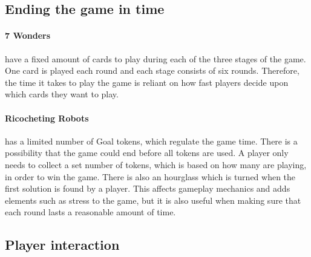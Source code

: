 \documentclass[a4paper]{article}
\begin{document}
\subsection{Ending the game in time}
\paragraph{7 Wonders} have a fixed amount of cards to play during each of the three stages of the game. One card is played each round and each stage consists of six rounds. Therefore, the time it takes to play the game is reliant on how fast players decide upon which cards they want to play.


\paragraph{Ricocheting Robots} has a limited number of Goal tokens, which regulate the game time. There is a possibility that the game could end before all tokens are used. A player only needs to collect a set number of tokens, which is based on how many are playing, in order to win the game. There is also an hourglass which is turned when the first solution is found by a player. This affects gameplay mechanics and adds elements such as stress to the game, but it is also useful when making sure that each round lasts a reasonable amount of time. 

\subsection{Player interaction}
\end{document}
